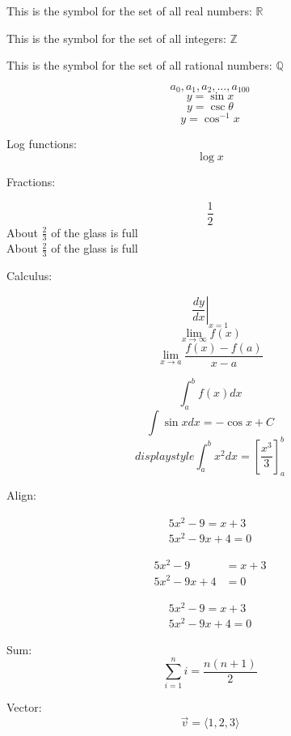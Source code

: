 \documentclass[12pt]{article}
\begin{document}
This is the symbol for the set of all real numbers: $\mathbb{R}$

This is the symbol for the set of all integers: $\mathbb{Z}$

This is the symbol for the set of all rational numbers: $\mathbb{Q}$

$${a_{0}, a_{1}, a_{2}, \ldots, a_{100}}$$
$${y=\sin{x}}$$
$${y=\csc{\theta}}$$
$${y=\cos^{-1}{x}}$$

Log functions:
$${\log{x}}$$

Fractions:

$${\frac{1}{2}}$$
About $\displaystyle \frac{2}{3}$ of the glass is full \\[12pt]
About $\frac{2}{3}$ of the glass is full

Calculus:

$$\left.\frac{dy}{dx}\right|_{x=1}$$
$$\lim_{x \to \infty} f(x)$$
$$\lim_{x \to a} \frac{f(x)-f(a)}{x-a}$$

$$\int_{a}^{b} f(x) dx$$
$$\int \sin{x} dx = -\cos{x} + C$$
$$displaystyle{\int_{a}^{b} x^2 dx = \left[\frac{x^3}{3}\right]_{a}^{b}}$$

Align:

\begin{align}
 5x^2-9 = x+3 \\
 5x^2-9x+4 = 0
\end{align}

\begin{align*}
 5x^2-9 &= x+3 \\
 5x^2-9x+4 &= 0
\end{align*}

\begin{align}
  5x^2-9 = x+3 \\
  5x^2-9x+4 = 0
\end{align}

Sum:
$$\sum_{i=1}^{n} i = \frac{n(n+1)}{2}$$

Vector:
$$\vec{v} = \langle 1, 2, 3 \rangle$$
\end{document}
